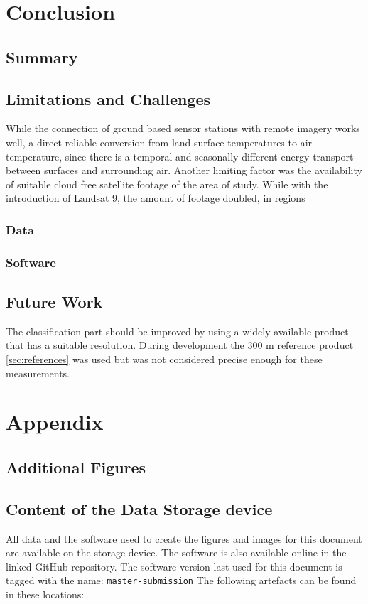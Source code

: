 \documentclass[12pt,a4paper, english]{article}
\begin{document}
\section{Conclusion}\label{sec:conclusion}
\subsection{Summary}

\subsection{Limitations and Challenges}
While the connection of ground based sensor stations with remote imagery works well, a direct reliable conversion from land surface temperatures to air temperature, since there is a temporal and seasonally different energy transport between surfaces and surrounding air. 
Another limiting factor was the availability of suitable cloud free satellite footage of the area of study.
While with the introduction of Landsat 9, the amount of footage doubled, in regions 

\subsubsection{Data}
\subsubsection{Software}

% 
\subsection{Future Work}
The classification part should be improved by using a widely available product that has a suitable resolution. 
During development the 300 m reference product \cref{sec:references} was used but was not considered precise enough for these measurements.

\newpage
\section{Appendix}
\subsection{Additional Figures}
\subsection{Content of the Data Storage device}
All data and the software used to create the figures and images for this document are available on the storage device.
The software is also available online in the linked GitHub repository.
The software version last used for this document is tagged with the name: \texttt{master-submission}
The following artefacts can be found in these locations:
\end{document}
